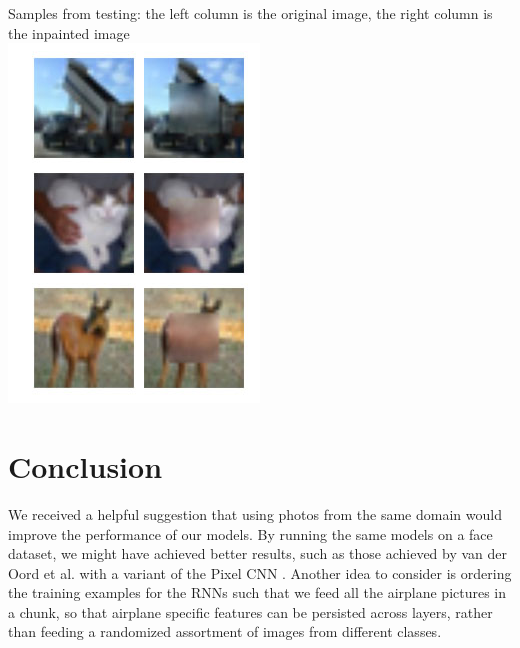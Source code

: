 \documentclass[10pt,twocolumn,letterpaper]{article}
\begin{document}
Samples from testing: the left column is the original image, the right column is the inpainted image \\
\includegraphics[width=0.8\linewidth]{baseline_test.jpg} 

\section{Conclusion}
We received a helpful suggestion that using photos from the same domain would improve the performance of our models. By running the same models on a face dataset, we might have achieved better results, such as those achieved by van der Oord et al. with a variant of the Pixel CNN \cite{pixelCNN}. Another idea to consider is ordering the training examples for the RNNs such that we feed all the airplane pictures in a chunk, so that airplane specific features can be persisted across layers, rather than feeding a randomized assortment of images from different classes.\\
\end{document}
